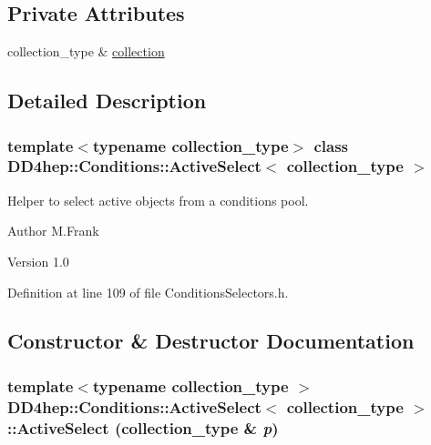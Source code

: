 \subsection*{Private Attributes}
\begin{DoxyCompactItemize}
\item 
collection\_\-type \& \hyperlink{class_d_d4hep_1_1_conditions_1_1_active_select_a413343e5a2aaf171132771e5ad3e0f5d}{collection}
\end{DoxyCompactItemize}


\subsection{Detailed Description}
\subsubsection*{template$<$typename collection\_\-type$>$ class DD4hep::Conditions::ActiveSelect$<$ collection\_\-type $>$}

Helper to select active objects from a conditions pool. \begin{DoxyAuthor}{Author}
M.Frank 
\end{DoxyAuthor}
\begin{DoxyVersion}{Version}
1.0 
\end{DoxyVersion}


Definition at line 109 of file ConditionsSelectors.h.

\subsection{Constructor \& Destructor Documentation}
\hypertarget{class_d_d4hep_1_1_conditions_1_1_active_select_a2d9d54374f340a323ce197c662669427}{
\subsubsection[{ActiveSelect}]{\setlength{\rightskip}{0pt plus 5cm}template$<$typename collection\_\-type $>$ {\bf DD4hep::Conditions::ActiveSelect}$<$ collection\_\-type $>$::{\bf ActiveSelect} (collection\_\-type \& {\em p})}}
\label{class_d_d4hep_1_1_conditions_1_1_active_select_a2d9d54374f340a323ce197c662669427}


